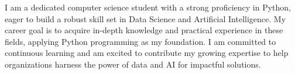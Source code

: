 \par{

I am a dedicated computer science student with a strong proficiency in Python, eager to build a robust skill set in Data Science and Artificial Intelligence. My career goal is to acquire in-depth knowledge and practical experience in these fields, applying Python programming as my foundation. I am committed to continuous learning and am excited to contribute my growing expertise to help organizations harness the power of data and AI for impactful solutions.


}